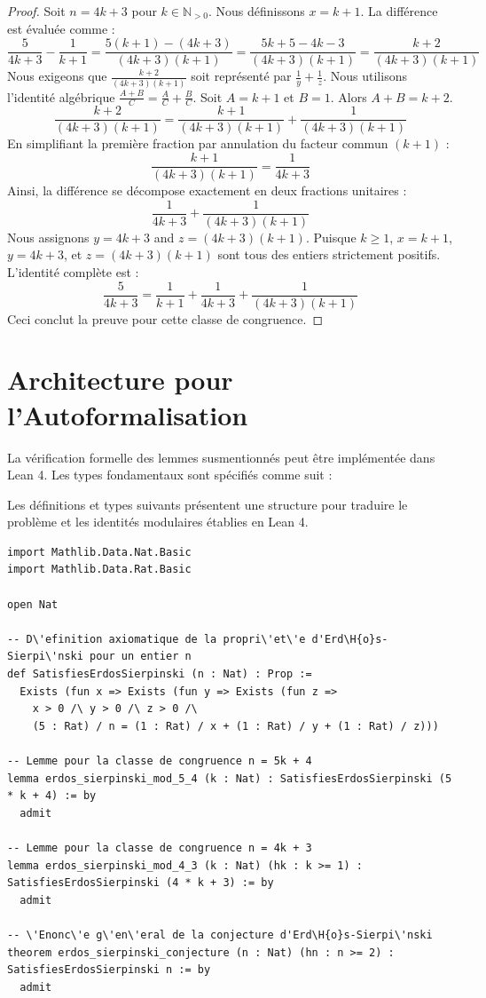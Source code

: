 \documentclass[12pt, a4paper]{article}
\begin{document}
\begin{proof}
Soit $n = 4k + 3$ pour $k \in \mathbb{N}_{>0}$.
Nous d\'efinissons $x = k+1$.
La diff\'erence est \'evalu\'ee comme :
\[ \frac{5}{4k+3} - \frac{1}{k+1} = \frac{5(k+1) - (4k+3)}{(4k+3)(k+1)} = \frac{5k+5-4k-3}{(4k+3)(k+1)} = \frac{k+2}{(4k+3)(k+1)} \]
Nous exigeons que $\frac{k+2}{(4k+3)(k+1)}$ soit repr\'esent\'e par $\frac{1}{y} + \frac{1}{z}$.
Nous utilisons l'identit\'e alg\'ebrique $\frac{A+B}{C} = \frac{A}{C} + \frac{B}{C}$. Soit $A = k+1$ et $B = 1$. Alors $A+B = k+2$.
\[ \frac{k+2}{(4k+3)(k+1)} = \frac{k+1}{(4k+3)(k+1)} + \frac{1}{(4k+3)(k+1)} \]
En simplifiant la premi\`ere fraction par annulation du facteur commun $(k+1)$ :
\[ \frac{k+1}{(4k+3)(k+1)} = \frac{1}{4k+3} \]
Ainsi, la diff\'erence se d\'ecompose exactement en deux fractions unitaires :
\[ \frac{1}{4k+3} + \frac{1}{(4k+3)(k+1)} \]
Nous assignons $y = 4k+3$ and $z = (4k+3)(k+1)$. Puisque $k \ge 1$, $x=k+1$, $y=4k+3$, et $z=(4k+3)(k+1)$ sont tous des entiers strictement positifs.
L'identit\'e compl\`ete est :
\[ \frac{5}{4k+3} = \frac{1}{k+1} + \frac{1}{4k+3} + \frac{1}{(4k+3)(k+1)} \]
Ceci conclut la preuve pour cette classe de congruence.
\end{proof}

\section{Architecture pour l'Autoformalisation}
La v\'erification formelle des lemmes susmentionn\'es peut \^etre impl\'ement\'ee dans Lean 4. Les types fondamentaux sont sp\'ecifi\'es comme suit :

Les d\'efinitions et types suivants pr\'esentent une structure pour traduire le probl\`eme et les identit\'es modulaires \'etablies en Lean 4.

\begin{lstlisting}[language=lean, basicstyle=\ttfamily\small, breaklines=true]
import Mathlib.Data.Nat.Basic
import Mathlib.Data.Rat.Basic

open Nat

-- D\'efinition axiomatique de la propri\'et\'e d'Erd\H{o}s-Sierpi\'nski pour un entier n
def SatisfiesErdosSierpinski (n : Nat) : Prop :=
  Exists (fun x => Exists (fun y => Exists (fun z =>
    x > 0 /\ y > 0 /\ z > 0 /\
    (5 : Rat) / n = (1 : Rat) / x + (1 : Rat) / y + (1 : Rat) / z)))

-- Lemme pour la classe de congruence n = 5k + 4
lemma erdos_sierpinski_mod_5_4 (k : Nat) : SatisfiesErdosSierpinski (5 * k + 4) := by
  admit

-- Lemme pour la classe de congruence n = 4k + 3
lemma erdos_sierpinski_mod_4_3 (k : Nat) (hk : k >= 1) : SatisfiesErdosSierpinski (4 * k + 3) := by
  admit

-- \'Enonc\'e g\'en\'eral de la conjecture d'Erd\H{o}s-Sierpi\'nski
theorem erdos_sierpinski_conjecture (n : Nat) (hn : n >= 2) : SatisfiesErdosSierpinski n := by
  admit
\end{lstlisting}
\end{document}

